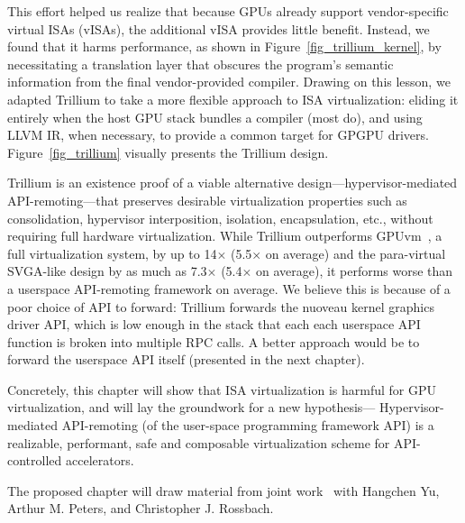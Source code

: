 This effort helped us realize that because GPUs already support vendor-specific
virtual ISAs (vISAs), the additional vISA provides little benefit.
Instead, we found that it harms performance, as shown in
Figure~\ref{fig_trillium_kernel}, by necessitating a translation layer that
obscures the program's semantic information from the final vendor-provided
compiler.
Drawing on this lesson, we adapted Trillium to take a more flexible approach
to ISA virtualization: eliding it entirely when the host GPU stack bundles a
compiler (most do), and using LLVM IR, when necessary, to provide a common
target for GPGPU drivers. Figure~\ref{fig_trillium} visually presents the
Trillium design.

Trillium is an existence proof of a viable alternative
design---hypervisor-mediated API-remoting---that preserves
desirable virtualization properties such as consolidation, hypervisor
interposition, isolation, encapsulation, etc., without requiring full hardware
virtualization.
While Trillium outperforms GPUvm~\cite{suzuki2014gpuvm}, a full virtualization
system, by up to 14$\times$ (5.5$\times$ on average) and the para-virtual
SVGA-like design by as much as 7.3$\times$ (5.4$\times$ on average), it
performs worse than a userspace API-remoting framework on average. We believe
this is because of a poor choice of API to forward: Trillium forwards the
nuoveau kernel graphics driver API, which is low enough in the stack that each
each userspace API function is broken into multiple RPC calls. A better
approach would be to forward the userspace API itself (presented in the next
chapter).

Concretely, this chapter will show that ISA virtualization is harmful for GPU
virtualization, and will lay the groundwork for a new hypothesis---%
Hypervisor-mediated API-remoting (of the user-space programming framework API)
is a realizable, performant, safe and composable virtualization scheme for
API-controlled accelerators.

The proposed chapter will draw material from joint work~\cite{trillium} with
Hangchen Yu, Arthur M. Peters, and Christopher J. Rossbach.